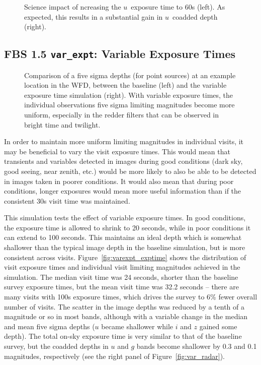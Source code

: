 \begin{figure}
\caption{Science impact of ncreasing the $u$\ exposure time to 60s (left).  As expected, this results in a substantial gain in $u$\ coadded depth (right).}
\label{fig:u60_radar}
\end{figure}

\subsection{FBS 1.5 {\tt var\_expt}: Variable Exposure Times}\label{ss:var_expt}

\begin{figure}
\caption{Comparison of a five sigma depths (for point sources) at an example location in the WFD, between the baseline (left) and the variable exposure time simulation (right). With variable exposure times, the individual observations five sigma limiting magnitudes become more uniform, especially in the redder filters that can be observed in bright time and twilight.}\label{fig:varexptime}
\end{figure}

In order to maintain more uniform limiting magnitudes in individual visits, it may be beneficial to vary the visit exposure times. This would mean that transients and variables detected in images during good conditions (dark sky, good seeing, near zenith, etc.) would be more likely to also be able to be detected in images taken in poorer conditions. It would also mean that during poor conditions, longer exposures would mean more useful information than if the consistent 30s visit time was maintained. 

This simulation tests the effect of variable exposure times. In good conditions, the exposure time is allowed to shrink to 20 seconds, while in poor conditions it can extend to 100 seconds. This maintains an ideal depth which is somewhat shallower than the typical image depth in the baseline simulation, but is more consistent across visits. Figure~\ref{fig:varexpt_exptime} shows the distribution of visit exposure times and individual visit limiting magnitudes achieved in the simulation. The median visit time was 24 seconds, shorter than the baseline survey exposure times, but the mean visit time was 32.2 seconds -- there are many visits with 100s exposure times, which drives the survey to 6\% fewer overall number of visits. The scatter in the image depths was reduced by a tenth of a magnitude or so in most bands, although with a variable change in the median and mean five sigma depths ($u$ became shallower while $i$ and $z$ gained some depth). The total on-sky exposure time is very similar to that of the baseline survey, but the coadded depths in $u$ and $g$ bands become shallower by 0.3 and 0.1 magnitudes, respectively (see the right panel of Figure~\ref{fig:var_radar}).

